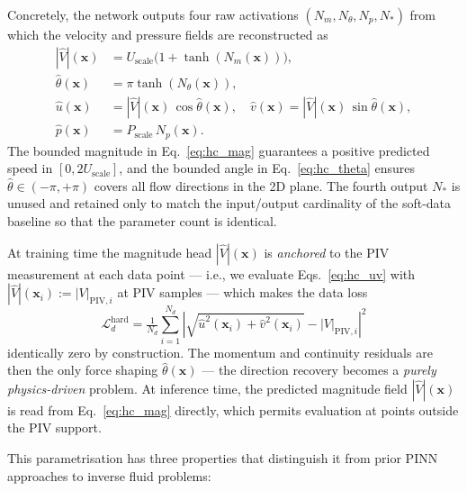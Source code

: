 \documentclass[12pt,a4paper]{article}
\newcommand{\bx}{\bm{x}}          %
\newcommand{\Loss}{\mathcal{L}}    %
\begin{document}
Concretely, the network outputs four raw activations
$(N_m, N_\theta, N_p, N_*)$ from which the velocity and pressure
fields are reconstructed as
\begin{align}
  |\hat{V}|(\bx)  &= U_{\text{scale}}\bigl(1 + \tanh(N_m(\bx))\bigr),
                     \label{eq:hc_mag}  \\
  \hat{\theta}(\bx) &= \pi \tanh(N_\theta(\bx)),
                     \label{eq:hc_theta} \\
  \hat{u}(\bx)    &= |\hat{V}|(\bx)\,\cos\hat{\theta}(\bx),
                     \quad
  \hat{v}(\bx)    = |\hat{V}|(\bx)\,\sin\hat{\theta}(\bx),
                     \label{eq:hc_uv} \\
  \hat{p}(\bx)    &= P_{\text{scale}}\,N_p(\bx).
                     \label{eq:hc_p}
\end{align}
The bounded magnitude in Eq.~\eqref{eq:hc_mag} guarantees a
positive predicted speed in $[0, 2 U_{\text{scale}}]$, and the
bounded angle in Eq.~\eqref{eq:hc_theta} ensures
$\hat{\theta} \in (-\pi, +\pi)$ covers all flow directions in the
2D plane. The fourth output $N_*$ is unused and retained only to
match the input/output cardinality of the soft-data baseline so
that the parameter count is identical.

At training time the magnitude head $|\hat{V}|(\bx)$ is
\emph{anchored} to the PIV measurement at each data point ---
i.e., we evaluate Eqs.~\eqref{eq:hc_uv} with
$|\hat{V}|(\bx_i) := |V|_{\text{PIV},i}$ at PIV samples ---
which makes the data loss
\begin{equation}
  \Loss_d^{\text{hard}}
   = \tfrac{1}{N_d}\sum_{i=1}^{N_d}
     \left|\sqrt{\hat{u}^2(\bx_i) + \hat{v}^2(\bx_i)} - |V|_{\text{PIV},i}\right|^2
\end{equation}
identically zero by construction. The momentum and continuity
residuals are then the only force shaping
$\hat{\theta}(\bx)$ --- the direction recovery becomes a
\emph{purely physics-driven} problem. At inference time, the
predicted magnitude field $|\hat{V}|(\bx)$ is read from
Eq.~\eqref{eq:hc_mag} directly, which permits evaluation at
points outside the PIV support.

This parametrisation has three properties that distinguish it
from prior PINN approaches to inverse fluid problems:
\end{document}
